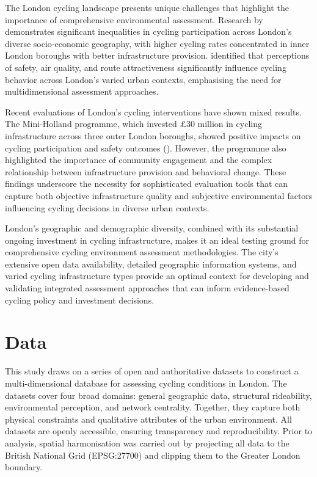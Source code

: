 \documentclass[
  12pt,
  oneside]{book}
\begin{document}
The London cycling landscape presents unique challenges that highlight the importance of comprehensive environmental assessment. Research by \textcite{goodman_inequalities_2018} demonstrates significant inequalities in cycling participation across London's diverse socio-economic geography, with higher cycling rates concentrated in inner London boroughs with better infrastructure provision. \textcite{aldred_investigating_2015} identified that perceptions of safety, air quality, and route attractiveness significantly influence cycling behavior across London's varied urban contexts, emphasising the need for multidimensional assessment approaches.

Recent evaluations of London's cycling interventions have shown mixed results. The Mini-Holland programme, which invested £30 million in cycling infrastructure across three outer London boroughs, showed positive impacts on cycling participation and safety outcomes (\textcite{aldred_impacts_2019}). However, the programme also highlighted the importance of community engagement and the complex relationship between infrastructure provision and behavioral change. These findings underscore the necessity for sophisticated evaluation tools that can capture both objective infrastructure quality and subjective environmental factors influencing cycling decisions in diverse urban contexts.

London's geographic and demographic diversity, combined with its substantial ongoing investment in cycling infrastructure, makes it an ideal testing ground for comprehensive cycling environment assessment methodologies. The city's extensive open data availability, detailed geographic information systems, and varied cycling infrastructure types provide an optimal context for developing and validating integrated assessment approaches that can inform evidence-based cycling policy and investment decisions.

\section{Data}\label{data}

This study draws on a series of open and authoritative datasets to construct a multi-dimensional database for assessing cycling conditions in London. The datasets cover four broad domains: general geographic data, structural rideability, environmental perception, and network centrality. Together, they capture both physical constraints and qualitative attributes of the urban environment. All datasets are openly accessible, ensuring transparency and reproducibility. Prior to analysis, spatial harmonisation was carried out by projecting all data to the British National Grid (EPSG:27700) and clipping them to the Greater London boundary.
\end{document}
